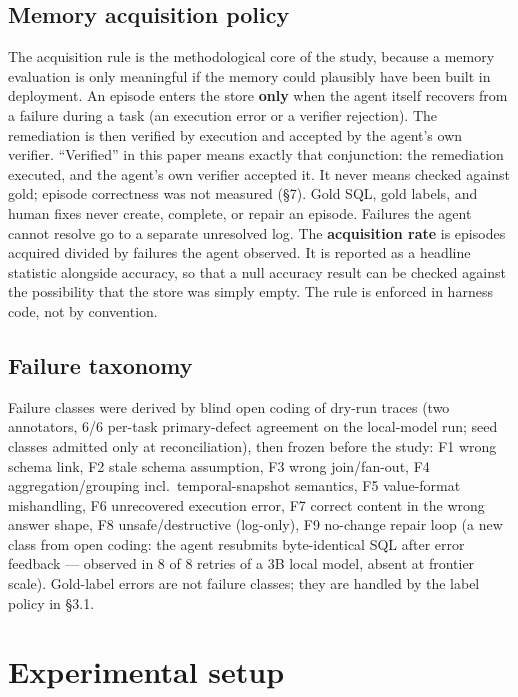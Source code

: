 \documentclass[sigconf, nonacm]{acmart}
\begin{document}
\subsection{Memory acquisition policy}

The acquisition rule is the methodological core of the study, because a memory evaluation is only meaningful if the memory could plausibly have been built in deployment. An episode enters the store \textbf{only} when the agent itself recovers from a failure during a task (an execution error or a verifier rejection). The remediation is then verified by execution and accepted by the agent's own verifier. ``Verified'' in this paper means exactly that conjunction: the remediation executed, and the agent's own verifier accepted it. It never means checked against gold; episode correctness was not measured (\S7). Gold SQL, gold labels, and human fixes never create, complete, or repair an episode. Failures the agent cannot resolve go to a separate unresolved log. The \textbf{acquisition rate} is episodes acquired divided by failures the agent observed. It is reported as a headline statistic alongside accuracy, so that a null accuracy result can be checked against the possibility that the store was simply empty. The rule is enforced in harness code, not by convention.

\subsection{Failure taxonomy}

Failure classes were derived by blind open coding of dry-run traces (two annotators, 6/6 per-task primary-defect agreement on the local-model run; seed classes admitted only at reconciliation), then frozen before the study: F1 wrong schema link, F2 stale schema assumption, F3 wrong join/fan-out, F4 aggregation/grouping incl.\ temporal-snapshot semantics, F5 value-format mishandling, F6 unrecovered execution error, F7 correct content in the wrong answer shape, F8 unsafe/destructive (log-only), F9 no-change repair loop (a new class from open coding: the agent resubmits byte-identical SQL after error feedback --- observed in 8 of 8 retries of a 3B local model, absent at frontier scale). Gold-label errors are not failure classes; they are handled by the label policy in \S3.1.

\section{Experimental setup}
\end{document}

